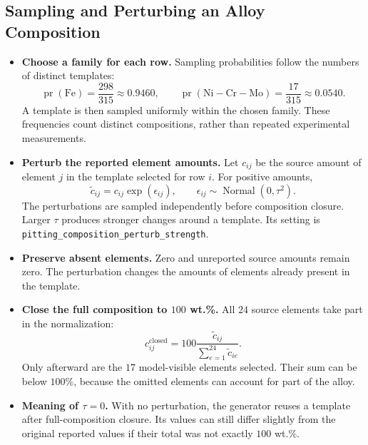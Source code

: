\documentclass[11pt]{article}
\newcommand{\pr}{\operatorname{pr}}
\newenvironment{notes}
  {\begin{itemize}\setlength{\itemsep}{0.45em}\setlength{\parsep}{0pt}}
  {\end{itemize}}
\begin{document}
\subsection{Sampling and Perturbing an Alloy Composition}
\label{sec:composition-generator}

\begin{notes}
    \item \textbf{Choose a family for each row.} Sampling
    probabilities follow the numbers of distinct templates:
    \[
        \pr(\mathrm{Fe})=\frac{298}{315}\approx0.9460,
        \qquad
        \pr(\mathrm{Ni\!-\!Cr\!-\!Mo})
            =\frac{17}{315}\approx0.0540.
    \]
    A template is then sampled uniformly within the chosen
    family. These frequencies count distinct compositions,
    rather than repeated experimental measurements.

    \item \textbf{Perturb the reported element amounts.}
    Let \(c_{ij}\) be the source amount of element \(j\) in
    the template selected for row \(i\). For positive amounts,
    \begin{equation}
        \widetilde c_{ij}=c_{ij}\exp(\epsilon_{ij}),
        \qquad
        \epsilon_{ij}\sim\operatorname{Normal}(0,\tau^2).
        \label{eq:composition-perturbation}
    \end{equation}
    The perturbations are sampled independently before
    composition closure. Larger \(\tau\) produces stronger
    changes around a template.
    Its setting is \texttt{pitting\_composition\_perturb\_strength}.

    \item \textbf{Preserve absent elements.} Zero and unreported
    source amounts remain zero. The perturbation changes the
    amounts of elements already present in the template.

    \item \textbf{Close the full composition to \(100\) wt.\%.}
    All \(24\) source elements take part in the normalization:
    \begin{equation}
        c_{ij}^{\mathrm{closed}}
        =
        100\frac{\widetilde c_{ij}}
                 {\sum_{e=1}^{24}\widetilde c_{ie}}.
        \label{eq:composition-closure}
    \end{equation}
    Only afterward are the \(17\) model-visible elements selected.
    Their sum can be below \(100\%\), because the omitted elements
    can account for part of the alloy.

    \item \textbf{Meaning of \(\tau=0\).} With no perturbation,
    the generator reuses a template after full-composition
    closure. Its values can still differ slightly from the
    original reported values if their total was not exactly
    \(100\) wt.\%.


\end{notes}
\end{document}
